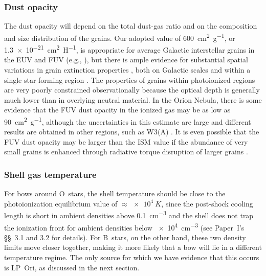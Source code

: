 \subsubsection{Dust opacity}
\label{sec:dust-opacity}
The dust opacity will depend on the total dust-gas ratio and on the
composition and size distribution of the grains.  Our adopted value of
\SI{600}{cm^2.g^{-1}}, or \SI{1.3e-21}{cm^2.H^{-1}}, is appropriate
for average Galactic interstellar grains in the EUV and FUV (e.g.,
\citealp{Weingartner:2001a}), but there is ample evidence for
substantial spatial variations in grain extinction properties
\citep{Fitzpatrick:2007a}, both on Galactic scales
\citep{Schlafly:2016a} and within a single star forming region
\citep{Beitia-Antero:2017a}.  The properties of grains within
photoionized regions are very poorly constrained observationally
because the optical depth is generally much lower than in overlying
neutral material.  In the Orion Nebula, there is some evidence
\citep{Salgado:2016a} that the FUV dust opacity in the ionized gas may
be as low as \SI{90}{cm^2.g^{-1}}, although the uncertainties in this
estimate are large and different results are obtained in other
regions, such as W3(A) \citep{Salgado:2012a}.  It is even possible
that the FUV dust opacity may be larger than the ISM value if the
abundance of very small grains is enhanced through radiative torque
disruption of larger grains \citep{Hoang:2018a}.

\subsubsection{Shell gas temperature}
\label{sec:shell-gas-temp}
For bows around O~stars, the shell temperature should be close to the
photoionization equilibrium value of \(\approx \SI{e4}{K}\), since the
post-shock cooling length is short in ambient densities above
\SI{0.1}{cm^{-3}}
and the shell does not trap the ionization front for ambient densities
below \SI{e4}{cm^{-3}} (see Paper~I's \S\S~3.1 and 3.2 for details).
For B~stars, on the other hand, these two density limits move closer
together,
making it more likely that a bow will lie in a different temperature
regime.  The only source for which we have evidence that this occurs
is LP~Ori, as discussed in the next section.

